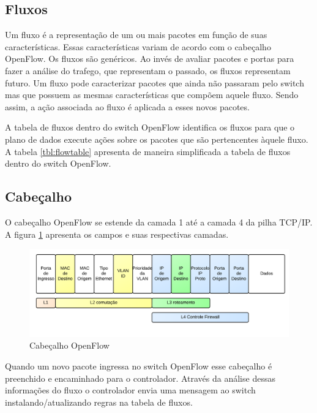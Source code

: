 \subsection{Fluxos}

Um fluxo é a representação de um ou mais pacotes em função de suas
características.
Essas características variam de acordo com o cabeçalho OpenFlow.
Os fluxos são genéricos. 
Ao invés de avaliar pacotes e portas para fazer a análise do trafego,
que representam o passado, os fluxos representam futuro. 
Um fluxo pode caracterizar pacotes que ainda não passaram pelo switch mas 
que possuem as mesmas características que compõem aquele fluxo. 
Sendo assim, a ação associada ao fluxo é aplicada a esses novos pacotes.




A tabela de fluxos dentro do switch OpenFlow identifica os fluxos para que o 
plano de dados execute ações sobre os pacotes que são pertencentes àquele
fluxo. 
A tabela \ref{tbl:flowtable} apresenta de maneira simplificada a tabela 
de fluxos dentro do switch OpenFlow.

\subsection{Cabeçalho}

O cabeçalho OpenFlow se estende da camada 1 até a camada 4 da pilha TCP/IP.
A figura \ref{fig:of-header} apresenta os campos e suas respectivas camadas.

\begin{figure}[h!]
    \centering
    \label{fig:of-header}
    \includegraphics[width=\linewidth]{img/openflow-header}
    \caption{Cabeçalho OpenFlow}
\end{figure}

Quando um novo pacote ingressa no switch OpenFlow esse cabeçalho é preenchido
e encaminhado para o controlador. 
Através da análise dessas informações do fluxo o controlador envia uma 
mensagem ao switch instalando/atualizando regras na tabela de fluxos. 

